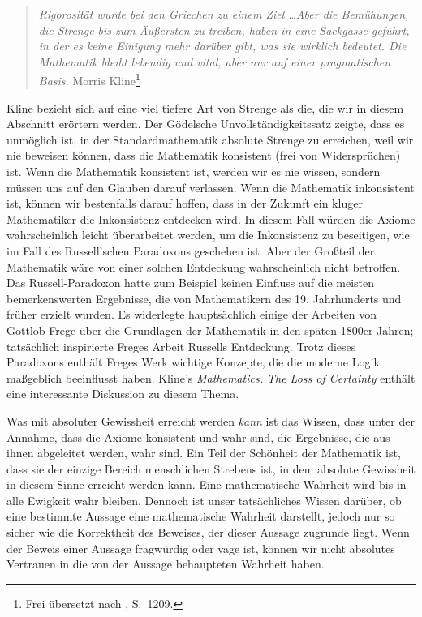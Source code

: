 \begin{quote}
  {\em Rigorosität wurde bei den Griechen zu einem Ziel \ldots Aber die Bemühungen, die Strenge bis zum Äußersten zu treiben, haben in eine Sackgasse geführt, in der es keine Einigung mehr darüber gibt, was sie wirklich bedeutet.  Die Mathematik bleibt lebendig und vital, aber nur auf einer pragmatischen Basis.}
    \flushright\sc  Morris Kline\footnote{Frei übersetzt nach \cite{Kline}, S.~1209.}\\
\end{quote}

Kline bezieht sich auf eine viel tiefere Art von Strenge als die, die wir in diesem Abschnitt erörtern werden.  Der Gödelsche Unvollständigkeitssatz zeigte, dass es unmöglich ist, in der Standardmathematik absolute Strenge zu erreichen, weil wir nie beweisen können, dass die Mathematik konsistent (frei von Widersprüchen) ist.  Wenn die Mathematik konsistent ist, werden wir es nie wissen, sondern müssen uns auf den Glauben darauf verlassen.  Wenn die Mathematik inkonsistent ist, können wir bestenfalls darauf hoffen, dass in der Zukunft ein kluger Mathematiker die Inkonsistenz entdecken wird.  In diesem Fall würden die Axiome wahrscheinlich leicht überarbeitet werden, um die Inkonsistenz zu beseitigen, wie im Fall des Russell'schen Paradoxons geschehen ist. Aber der Großteil der Mathematik wäre von einer solchen Entdeckung wahrscheinlich nicht betroffen.  Das Russell-Paradoxon hatte zum Beispiel keinen Einfluss auf die meisten bemerkenswerten Ergebnisse, die von Mathematikern des 19. Jahrhunderts und früher erzielt wurden.  Es widerlegte hauptsächlich einige der Arbeiten von Gottlob Frege über die Grundlagen der Mathematik in den späten 1800er Jahren; tatsächlich inspirierte Freges Arbeit Russells Entdeckung.  Trotz dieses Paradoxons enthält Freges Werk wichtige Konzepte, die die moderne Logik maßgeblich beeinflusst haben.  Kline's {\em Mathematics, The Loss of Certainty} \cite{Klinel} enthält eine interessante Diskussion zu diesem Thema.

Was mit absoluter Gewissheit erreicht werden {\em kann} ist das Wissen, dass unter der Annahme, dass die Axiome konsistent und wahr sind, die Ergebnisse, die aus ihnen abgeleitet werden, wahr sind.  Ein Teil der Schönheit der Mathematik ist, dass sie der einzige Bereich menschlichen Strebens ist, in dem absolute Gewissheit in diesem Sinne erreicht werden kann.  Eine mathematische Wahrheit wird bis in alle Ewigkeit wahr bleiben.  Dennoch ist unser tatsächliches Wissen darüber, ob eine bestimmte Aussage eine mathematische Wahrheit darstellt, jedoch nur so sicher wie die Korrektheit des Beweises, der dieser Aussage zugrunde liegt.
Wenn der Beweis einer Aussage fragwürdig oder vage ist, können wir nicht absolutes Vertrauen in die von der Aussage behaupteten Wahrheit haben.

